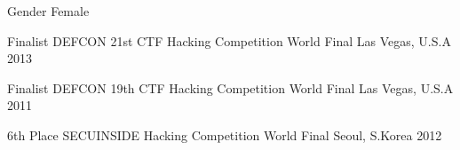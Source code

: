 


\cvsubsection{}


\begin{cvhonors}


\cvhonor
{Gender} %
{Female} %
{} %
{} %


\cvhonor
{Finalist} %
{DEFCON 21st CTF Hacking Competition World Final} %
{Las Vegas, U.S.A} %
{2013} %


\cvhonor
{Finalist} %
{DEFCON 19th CTF Hacking Competition World Final} %
{Las Vegas, U.S.A} %
{2011} %


\cvhonor
{6th Place} %
{SECUINSIDE Hacking Competition World Final} %
{Seoul, S.Korea} %
{2012} %


\end{cvhonors}




